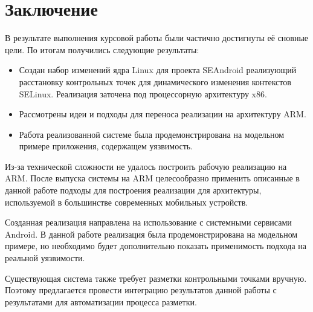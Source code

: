 \newpage
\section{Заключение}

В результате выполнения курсовой работы были частично достигнуты её
сновные цели. По итогам получились следующие результаты:

\begin{itemize}

    \item Создан набор изменений ядра Linux для проекта SEAndroid
        реализующий расстановку контрольных точек для динамического
        изменения контекстов SELinux. Реализация заточена под
        процессорную архитектуру x86.

    \item Рассмотрены идеи и подходы для переноса реализации на
        архитектуру ARM.

    \item Работа реализованной системе была продемонстрирована на
        модельном примере приложения, содержащем уязвимость.

\end{itemize}

Из-за технической сложности не удалось построить рабочую реализацию на
ARM. После выпуска системы \cite{uprobes} на ARM целесообразно применить
описанные в данной работе подходы для построения реализации для
архитектуры, используемой в большинстве современных мобильных устройств.

Созданная реализация направлена на использование с системными сервисами
Android. В данной работе реализация была продемонстрирована на модельном
примере, но необходимо будет дополнительно показать применимость подхода
на реальной уязвимости. 

Существующая система также требует разметки контрольными точками
вручную. Поэтому предлагается провести интеграцию результатов данной
работы с результатами \cite{mso} для автоматизации процесса разметки.

\newpage

